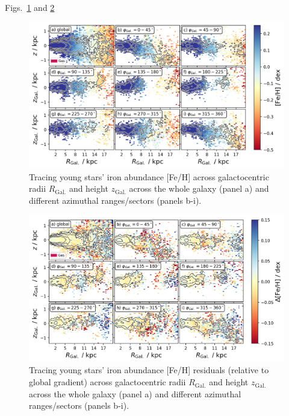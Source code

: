 \documentclass[fleqn,usenatbib]{mnras}
\begin{document}
Figs.~\ref{fig:tracing_fe_h_young_stars_in_angles} and \ref{fig:tracing_fe_h_residuals_young_stars_in_angles}

\begin{figure}
    \centering
    \includegraphics[width=\columnwidth]{figures/tracing_fe_h_young_stars_in_angles.png}
    \caption{Tracing young stars' iron abundance [Fe/H] across galactocentric radii $R_\mathrm{Gal.}$ and height $z_\mathrm{Gal.}$ across the whole galaxy (panel a) and different azimuthal ranges/sectors (panels b-i).}
    \label{fig:tracing_fe_h_young_stars_in_angles}
\end{figure}

\begin{figure}
    \centering
    \includegraphics[width=\columnwidth]{figures/tracing_fe_h_residuals_young_stars_in_angles.png}
    \caption{Tracing young stars' iron abundance [Fe/H] residuals (relative to global gradient) across galactocentric radii $R_\mathrm{Gal.}$ and height $z_\mathrm{Gal.}$ across the whole galaxy (panel a) and different azimuthal ranges/sectors (panels b-i).}
    \label{fig:tracing_fe_h_residuals_young_stars_in_angles}
\end{figure}
\end{document}
